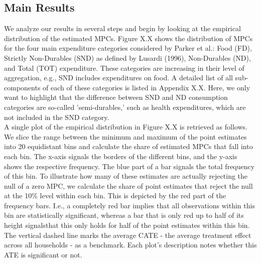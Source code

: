 \subsection{Main Results}
We analyze our results in several steps and begin by looking at the empirical distribution of the estimated MPCs. Figure X.X shows the distribution of MPCs for the four main expenditure categories considered by Parker et al.: Food (FD), Strictly Non-Durables (SND) as defined by Lusardi (1996), Non-Durables (ND), and Total (TOT) expenditure. These categories are increasing in their level of aggregation, e.g., SND includes expenditures on food. A detailed list of all sub-components of each of these categories is listed in Appendix X.X. Here, we only want to highlight that the difference between SND and ND consumption categories are so-called 'semi-durables,' such as health expenditures, which are not included in the SND category. \\
A single plot of the empirical distribution in Figure X.X is retrieved as follows. We slice the range between the minimum and maximum of the point estimates into 20 equidistant bins and calculate the share of estimated MPCs that fall into each bin. The x-axis signals the borders of the different bins, and the y-axis shows the respective frequency. The blue part of a bar signals the total frequency of this bin. To illustrate how many of these estimates are actually rejecting the null of a zero MPC, we calculate the share of point estimates that reject the null at the 10\% level within each bin. This is depicted by the red part of the frequency bars. I.e., a completely red bar implies that all observations within this bin are statistically significant, whereas a bar that is only red up to half of its height signalsthat this only holds for half of the point estimates within this bin. The vertical dashed line marks the average CATE - the average treatment effect across all households - as a benchmark. Each plot's description notes whether this ATE is significant or not. \\ 
